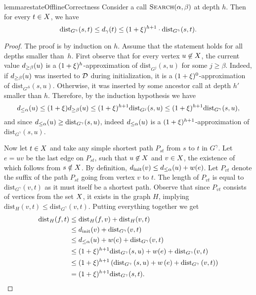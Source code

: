 \documentclass[11pt,letterpaper]{article}
\theoremstyle{plain}
\newcommand{\dist}{\mathrm{dist}}
\newcommand{\eq}[1]{\begin{align*} #1 \end{align*}}
\begin{document}
\begin{restatable}[]{lemma}{restateOfflineCorrectness}\label{theorem:error bound}
Consider a call $\textproc{Search}(\alpha, \beta)$ at depth $h$. Then for every $t\in X$, we have
\[ \dist_{G^\gamma}(s,t)\leq d_\gamma(t) \leq (1+\epsp)^{h+1}\cdot \dist_{G^\gamma}(s,t). \]
\end{restatable}
\begin{proof}
The proof is by induction on $h$. Assume that the statement holds for all depths smaller than~$h$.
First observe that for every vertex $u \not\in X$, the current value $d_{\ge\beta}(u)$ is a  $(1 + \xi)^{h}$\nobreakdash-approximation of $\dist_{G^j}(s,u)$ for some $j \ge \beta$.
Indeed, if $d_{\ge\beta}(u)$ was inserted to $\mathcal{D}$ during initialization, it is a $(1 + \xi)^0$-approximation of $\dist_{G^\Delta}(s,u)$.
Otherwise, it was inserted by some ancestor call at depth $h'$ smaller than $h$.
Therefore, by the induction hypothesis we have 
\begin{equation}
  \dla(u) \le (1 + \epsp) \dgb(u) \le (1 + \epsp)^{h + 1} \dist_{G^j}(s,u) \le (1 + \epsp)^{h + 1}\dist_{G^\gamma}(s,u), \label{outside VV equation}
\end{equation}
and since $\dla(u) \ge \dist_{G^\gamma}(s,u)$, indeed $d_{\le\alpha}(u)$ is a $(1 + \xi)^{h + 1}$-approximation of $\dist_{G^\gamma}(s,u)$.

Now let $t \in X$ and take any simple shortest path $P_{st}$ from $s$ to $t$ in $G^\gamma$.
Let $e=uv$ be the last edge on $P_{st}$,  such that $u \not\in X$ and $v \in X$, the existence of which follows from $s\notin X$.
By definition, $d_\mathrm{init}(v) \le d_{\le\alpha}(u) + w(e)$.
Let $P_{vt}$ denote the suffix of the path $P_{st}$ going from vertex $v$ to $t$.
The length of $P_{vt}$ is equal to $\dist_{G^\gamma}(v, t)$ as it must itself be a shortest path.
Observe that since $P_{vt}$ consists of vertices from the set $X$, it exists in the graph $H$, implying $\dist_H(v, t) \le \dist_{G^\gamma}(v, t)$.
Putting everything together we get
\eq{
  \dist_H(f, t) &\le \dist_H(f, v) + \dist_H(v, t)\\ 
  &\le \dinit(v) + \dist_{G^\gamma}(v, t) \\
  &\le \dla(u) + w(e) + \dist_{G^\gamma}(v, t) \\
  &\le (1 + \epsp)^{h + 1}\dist_{G^\gamma}(s, u) + w(e) + \dist_{G^\gamma}(v, t) \\
  &\le (1 + \epsp)^{h + 1}\left(\dist_{G^\gamma}\left(s, u\right) + w\left(e\right) + \dist_{G^\gamma}\left(v, t\right)\right) \\
  &= (1 + \epsp)^{h + 1}\dist_{G^\gamma}(s, t).
}


\end{proof}
\end{document}

